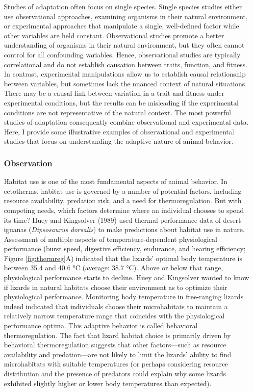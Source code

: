 \documentclass[
]{book}
\begin{document}
Studies of adaptation often focus on single species. Single species studies either use observational approaches, examining organisms in their natural environment, or experimental approaches that manipulate a single, well-defined factor while other variables are held constant. Observational studies promote a better understanding of organisms in their natural environment, but they often cannot control for all confounding variables. Hence, observational studies are typically correlational and do not establish causation between traits, function, and fitness. In contrast, experimental manipulations allow us to establish causal relationship between variables, but sometimes lack the nuanced context of natural situations. There may be a causal link between variation in a trait and fitness under experimental conditions, but the results can be misleading if the experimental conditions are not representative of the natural context. The most powerful studies of adaptation consequently combine observational and experimental data. Here, I provide some illustrative examples of observational and experimental studies that focus on understanding the adaptive nature of animal behavior.

\hypertarget{observation}{%
\subsubsection*{Observation}\label{observation}}

Habitat use is one of the most fundamental aspects of animal behavior. In ectotherms, habitat use is governed by a number of potential factors, including resource availability, predation risk, and a need for thermoregulation. But with competing needs, which factors determine where an individual chooses to spend its time? Huey and Kingsolver (1989) used thermal performance data of desert iguanas (\emph{Dipsosaurus dorsalis}) to make predictions about habitat use in nature. Assessment of multiple aspects of temperature-dependent physiological performance (burst speed, digestive efficiency, endurance, and hearing efficiency; Figure \ref{fig:thermreg}A) indicated that the lizards' optimal body temperature is between 35.4 and 40.6 °C (average: 38.7 °C). Above or below that range, physiological performance starts to decline. Huey and Kingsolver wanted to know if lizards in natural habitats choose their environment as to optimize their physiological performance. Monitoring body temperature in free-ranging lizards indeed indicated that individuals choose their microhabitats to maintain a relatively narrow temperature range that coincides with the physiological performance optima. This adaptive behavior is called behavioral thermoregulation. The fact that lizard habitat choice is primarily driven by behavioral thermoregulation suggests that other factors---such as resource availability and predation---are not likely to limit the lizards' ability to find microhabitats with suitable temperatures (or perhaps considering resource distribution and the presence of predators could explain why some lizards exhibited slightly higher or lower body temperatures than expected).
\end{document}
